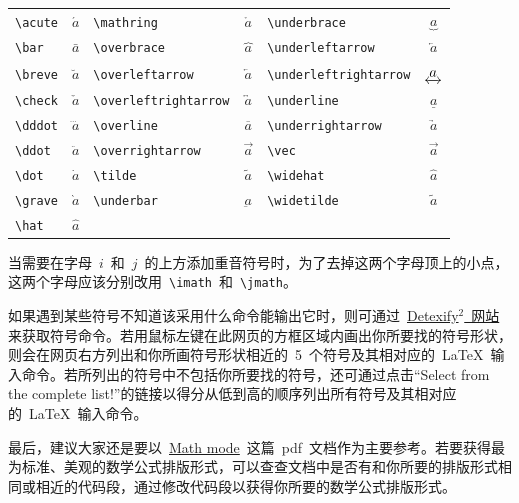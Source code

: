 {\vspace{0.5em}\noindent\wuhao\begin{tabularx}{\textwidth}{Xc|Xc|Xc}
  \verb|\acute| & $\acute{a}$ & \verb|\mathring|           & $\mathring{a}$           & \verb|\underbrace|          & $\underbrace{a}$          \\
  \verb|\bar|   & $\bar{a}$   & \verb|\overbrace|          & $\overbrace{a}$          & \verb|\underleftarrow|      & $\underleftarrow{a}$      \\
  \verb|\breve| & $\breve{a}$ & \verb|\overleftarrow|      & $\overleftarrow{a}$      & \verb|\underleftrightarrow| & $\underleftrightarrow{a}$ \\
  \verb|\check| & $\check{a}$ & \verb|\overleftrightarrow| & $\overleftrightarrow{a}$ & \verb|\underline|           & $\underline{a}$           \\
  \verb|\dddot| & $\dddot{a}$ & \verb|\overline|           & $\overline{a}$           & \verb|\underrightarrow|     & $\underrightarrow{a}$     \\
  \verb|\ddot|  & $\ddot{a}$  & \verb|\overrightarrow|     & $\overrightarrow{a}$     & \verb|\vec|                 & $\vec{a}$                 \\
  \verb|\dot|   & $\dot{a}$   & \verb|\tilde|              & $\tilde{a}$              & \verb|\widehat|             & $\widehat{a}$             \\
  \verb|\grave| & $\grave{a}$ & \verb|\underbar|           & $\underbar{a}$           & \verb|\widetilde|           & $\widetilde{a}$           \\
  \verb|\hat|   & $\hat{a}$
\end{tabularx}\vspace{0.5em}}

当需要在字母~$i$~和~$j$~的上方添加重音符号时，为了去掉这两个字母顶上的小点，这两个字母应该分别改用~\verb|\imath|~和~\verb|\jmath|。

如果遇到某些符号不知道该采用什么命令能输出它时，则可通过~\href{http://detexify.kirelabs.org/classify.html}{Detexify$^2$~网站}来获取符号命令。若用鼠标左键在此网页的方框区域内画出你所要找的符号形状，则会在网页右方列出和你所画符号形状相近的~5~个符号及其相对应的~\LaTeX~输入命令。若所列出的符号中不包括你所要找的符号，还可通过点击“Select from the complete list!”的链接以得分从低到高的顺序列出所有符号及其相对应的~\LaTeX~输入命令。

最后，建议大家还是要以~\href{http://tug.ctan.org/cgi-bin/ctanPackageInformation.py?id=voss-mathmode}{Math mode}~这篇~pdf~文档作为主要参考。若要获得最为标准、美观的数学公式排版形式，可以查查文档中是否有和你所要的排版形式相同或相近的代码段，通过修改代码段以获得你所要的数学公式排版形式。

